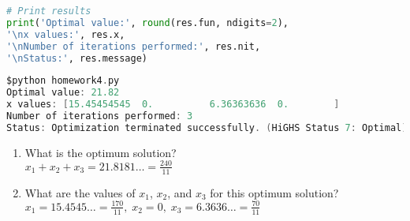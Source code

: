 \documentclass[12pt]{article}
\newenvironment{problem}[2][Problem]{\begin{trivlist}
\item[\hskip \labelsep {\bfseries #1}\hskip \labelsep {\bfseries #2.}]}{\end{trivlist}}
\begin{document}
\begin{problem}{3}
\begin{enumerate}[label=(\alph*)]
\begin{lstlisting}[language=Python, caption=homework4.py]
# Print results
print('Optimal value:', round(res.fun, ndigits=2),
'\nx values:', res.x,
'\nNumber of iterations performed:', res.nit,
'\nStatus:', res.message)
    \end{lstlisting}
    \begin{lstlisting}[language=C, caption=execution of homework4.py]
$python homework4.py
Optimal value: 21.82 
x values: [15.45454545  0.          6.36363636  0.        ] 
Number of iterations performed: 3
Status: Optimization terminated successfully. (HiGHS Status 7: Optimal)
    \end{lstlisting}
    \begin{enumerate}[label=(\alph*)]
        \item What is the optimum solution?\\
        $x_1+x_2+x_3=21.8181\ldots=\frac{240}{11}$
        \item What are the values of $x_1$, $x_2$, and $x_3$ for this optimum solution?\\
        $x_1 = 15.4545\ldots = \frac{170}{11},\;x_2=0,\;x_3=6.3636\ldots=\frac{70}{11}$
    \end{enumerate}
\end{enumerate}

\end{problem}


 
\end{document}

